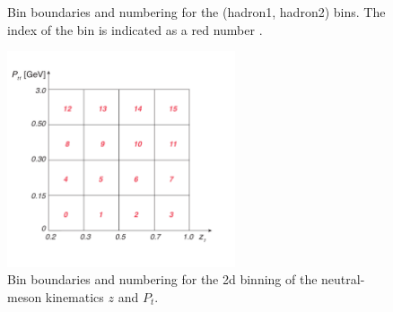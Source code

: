 \begin{figure}[H]
\captionsetup[subfloat]{farskip=2pt,captionskip=1pt}
\centering
{}
\caption{Bin boundaries and numbering for the (hadron1, hadron2) bins. The index of the bin is indicated as a red number	.}
\label{fig:binnings}
\end{figure}

\begin{figure}[H]
    \centering
    \includegraphics[width=0.6\textwidth,natwidth=250,natheight=100]{figure_dataselection/zptbin.pdf}
    \caption{Bin boundaries and numbering for the 2d binning of the neutral-meson kinematics $z$ and $P_t$.}
    \label{fig:zptbin}
\end{figure}



